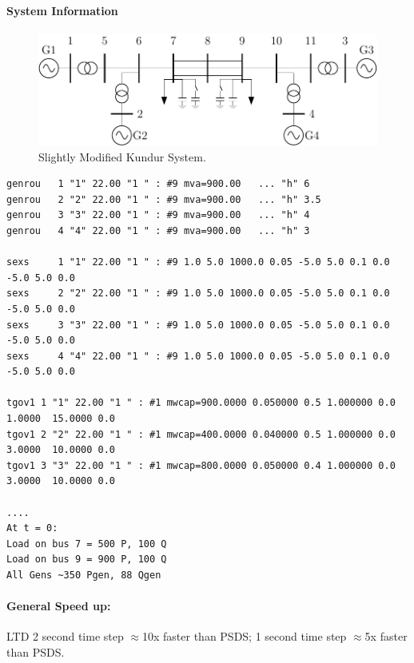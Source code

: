 \documentclass[12pt]{article}
\begin{document}
\paragraph{System Information}
\newcommand{\figW}{1}
	\begin{figure}[h!]
			\centering
			\includegraphics[width=\figW\linewidth]{kundur4LTD.pdf}\vspace{-.5em}
			\caption{Slightly Modified Kundur System.}
			\label{system}		 
	\end{figure}%

\begin{Verbatim}
genrou   1 "1" 22.00 "1 " : #9 mva=900.00   ... "h" 6   
genrou   2 "2" 22.00 "1 " : #9 mva=900.00   ... "h" 3.5 
genrou   3 "3" 22.00 "1 " : #9 mva=900.00   ... "h" 4  
genrou   4 "4" 22.00 "1 " : #9 mva=900.00   ... "h" 3  

sexs     1 "1" 22.00 "1 " : #9 1.0 5.0 1000.0 0.05 -5.0 5.0 0.1 0.0 -5.0 5.0 0.0
sexs     2 "2" 22.00 "1 " : #9 1.0 5.0 1000.0 0.05 -5.0 5.0 0.1 0.0 -5.0 5.0 0.0
sexs     3 "3" 22.00 "1 " : #9 1.0 5.0 1000.0 0.05 -5.0 5.0 0.1 0.0 -5.0 5.0 0.0
sexs     4 "4" 22.00 "1 " : #9 1.0 5.0 1000.0 0.05 -5.0 5.0 0.1 0.0 -5.0 5.0 0.0

tgov1 1 "1" 22.00 "1 " : #1 mwcap=900.0000 0.050000 0.5 1.000000 0.0   1.0000  15.0000 0.0
tgov1 2 "2" 22.00 "1 " : #1 mwcap=400.0000 0.040000 0.5 1.000000 0.0   3.0000  10.0000 0.0
tgov1 3 "3" 22.00 "1 " : #1 mwcap=800.0000 0.050000 0.4 1.000000 0.0   3.0000  10.0000 0.0

....
At t = 0:
Load on bus 7 = 500 P, 100 Q
Load on bus 9 = 900 P, 100 Q
All Gens ~350 Pgen, 88 Qgen
\end{Verbatim}

\paragraph{General Speed up:} LTD 2 second time step $\approx$10x faster than PSDS; 1 second time step $\approx$5x faster than PSDS.
\end{document}
